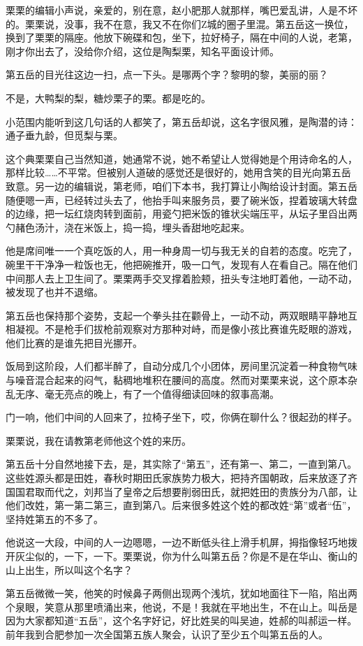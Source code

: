 \documentclass[lang=cn,newtx,12pt,scheme=chinese]{elegantbook}
\begin{document}
栗栗的编辑小声说，亲爱的，别在意，赵小肥那人就那样，嘴巴爱乱讲，人是不坏的。栗栗说，没事，我不在意，我又不在你们Z城的圈子里混。第五岳这一换位，换到了栗栗的隔座。他放下碗碟和包，坐下，拉好椅子，隔在中间的人说，老第，刚才你出去了，没给你介绍，这位是陶梨栗，知名平面设计师。

第五岳的目光往这边一扫，点一下头。是哪两个字？黎明的黎，美丽的丽？

不是，大鸭梨的梨，糖炒栗子的栗。都是吃的。

小范围内能听到这几句话的人都笑了，第五岳却说，这名字很风雅，是陶潜的诗：通子垂九龄，但觅梨与栗。

这个典栗栗自己当然知道，她通常不说，她不希望让人觉得她是个用诗命名的人，那样比较……不平常。但被别人道破的感觉还是很好的，她用含笑的目光向第五岳致意。另一边的编辑说，第老师，咱们下本书，我打算让小陶给设计封面。第五岳随便嗯一声，已经转过头去了，他抬手叫来服务员，要了碗米饭，捏着玻璃大转盘的边缘，把一坛红烧肉转到面前，用瓷勺把米饭的锥状尖端压平，从坛子里舀出两勺赭色汤汁，浇在米饭上，捣一捣，埋头香甜地吃起来。

他是席间唯一一个真吃饭的人，用一种身周一切与我无关的自若的态度。吃完了，碗里干干净净一粒饭也无，他把碗推开，吸一口气，发现有人在看自己。隔在他们中间那人去上卫生间了。栗栗两手交叉撑着脸颊，扭头专注地盯着他，一动不动，被发现了也并不退缩。

第五岳也保持那个姿势，支起一个拳头拄在颧骨上，一动不动，两双眼睛平静地互相凝视。不是枪手们拔枪前观察对方那种对峙，而是像小孩比赛谁先眨眼的游戏，他们比赛的是谁先把目光挪开。

饭局到这阶段，人们都半醉了，自动分成几个小团体，房间里沉淀着一种食物气味与噪音混合起来的闷气，黏稠地堆积在腰间的高度。然而对栗栗来说，这个原本杂乱无序、毫无亮点的晚上，有了一个值得细读回味的叙事高潮。

门一响，他们中间的人回来了，拉椅子坐下，哎，你俩在聊什么？很起劲的样子。

栗栗说，我在请教第老师他这个姓的来历。

第五岳十分自然地接下去，是，其实除了“第五”，还有第一、第二，一直到第八。这些姓源头都是田姓，春秋时期田氏家族势力极大，把持齐国朝政，后来放逐了齐国国君取而代之，刘邦当了皇帝之后想要削弱田氏，就把姓田的贵族分为八部，让他们改姓，第一第二第三，直到第八。后来很多姓这个姓的都改姓“第”或者“伍”，坚持姓第五的不多了。

他说这一大段，中间的人一边嗯嗯，一边不断低头往上滑手机屏，拇指像轻巧地拨开灰尘似的，一下，一下。栗栗说，你为什么叫第五岳？你是不是在华山、衡山的山上出生，所以叫这个名字？

第五岳微微一笑，他笑的时候鼻子两侧出现两个浅坑，犹如地面往下一陷，陷出两个泉眼，笑意从那里喷涌出来，他说，不是！我就在平地出生，不在山上。叫岳是因为大家都知道“五岳”，这个名字好记，好比姓吴的叫吴迪，姓郝的叫郝运一样。前年我到合肥参加一次全国第五族人聚会，认识了至少五个叫第五岳的人。
\end{document}
